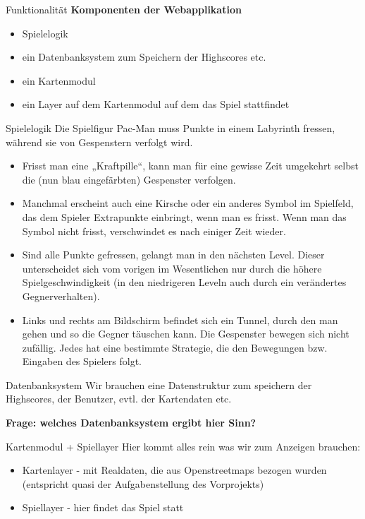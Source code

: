 \documentclass{beamer}
\begin{document}
\begin{frame}{Funktionalität}
\textbf{Komponenten der Webapplikation}
\begin{itemize}
\item Spielelogik
\item ein
Datenbanksystem zum Speichern der Highscores etc. 
\item ein Kartenmodul
\item ein Layer auf dem Kartenmodul auf dem das Spiel stattfindet
\end{itemize}
\end{frame}
\begin{frame}{Spielelogik}
Die Spielfigur Pac-Man muss Punkte in einem Labyrinth fressen, während sie von Gespenstern verfolgt wird.
\begin{itemize}
\item Frisst man eine „Kraftpille“, kann man für eine gewisse Zeit umgekehrt selbst die (nun blau eingefärbten) Gespenster verfolgen.
\item Manchmal erscheint auch eine Kirsche oder ein anderes Symbol im Spielfeld, das dem Spieler Extrapunkte einbringt, wenn man es frisst.
  Wenn man das Symbol nicht frisst, verschwindet es nach einiger Zeit wieder.
  \item Sind alle Punkte gefressen, gelangt man in den nächsten Level. Dieser unterscheidet sich vom vorigen im Wesentlichen nur durch die höhere Spielgeschwindigkeit (in den niedrigeren Leveln auch durch ein verändertes Gegnerverhalten).
\item
Links und rechts am Bildschirm befindet sich ein Tunnel, durch den man gehen und so die Gegner täuschen kann. Die Gespenster bewegen sich nicht zufällig. Jedes hat eine bestimmte Strategie, die den Bewegungen bzw. Eingaben des Spielers folgt.
\end{itemize}
\end{frame}
\begin{frame}{Datenbanksystem}
Wir brauchen eine Datenstruktur zum speichern der Highscores, der Benutzer, evtl. der Kartendaten etc.
\par\bigskip
\textbf{Frage: welches Datenbanksystem ergibt hier Sinn?}
\end{frame}
\begin{frame}{Kartenmodul + Spiellayer}
Hier kommt alles rein was wir zum Anzeigen brauchen:
\begin{itemize}
\item Kartenlayer - mit Realdaten, die aus Openstreetmaps bezogen wurden (entspricht quasi der Aufgabenstellung des Vorprojekts)
\item Spiellayer - hier findet das Spiel statt 
\end{itemize}
\end{frame}
\end{document}
